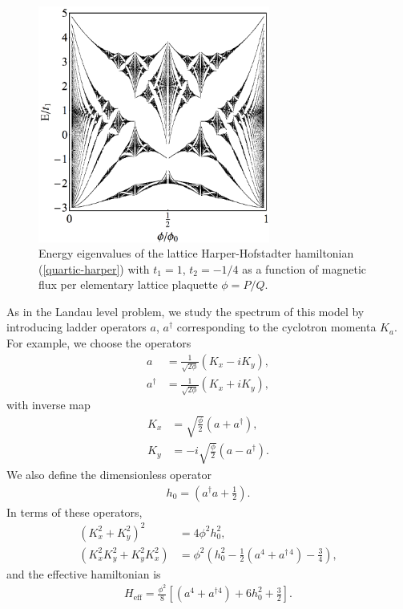 \documentclass[aps,prb,twocolumn,letterpaper,twoside,nobalancelastpage,groupedaddress,amsmath,amssymb,floatfix,citeautoscript]{revtex4-1}
\begin{document}
\begin{figure}[thb]
\centering
\hspace{-0.25in}\includegraphics[width=3.0in]{q-butterfly-raster-1200.pdf}
\caption{\label{butterfly-plot} Energy eigenvalues of the lattice Harper-Hofstadter hamiltonian (\ref{quartic-harper}) with $t_1 = 1$, $t_2 = -1/4$ as a function of magnetic flux per elementary lattice plaquette $\phi = P/Q$.}
\end{figure}

As in the Landau level problem, we study the spectrum of this model by introducing ladder operators $a$, $a^{\dag}$ corresponding to the cyclotron momenta $K_a$. For example, we choose the operators
\begin{align*}
a &= \frac{1}{\sqrt{2\phi}}\left(K_x - iK_y\right),\\
a^{\dag} &= \frac{1}{\sqrt{2\phi}}\left(K_x + iK_y\right),
\end{align*}
with inverse map
\begin{align*}
K_x &= \sqrt{\frac{\phi}{2}}\left(a + a^{\dag}\right),\\
K_y &= -i\sqrt{\frac{\phi}{2}}\left(a - a^{\dag}\right).
\end{align*}
We also define the dimensionless operator
\begin{align*}
h_0 = \left(a^{\dag}a + \frac{1}{2}\right).
\end{align*}
In terms of these operators,
\begin{align*}
\left(K_x^2 + K_y^2\right)^2 &= 4\phi^2 h_0^2, \\
\left(K_x^2K_y^2 + K_y^2K_x^2\right) &= \phi^2\left(h_0^2 -\frac{1}{2}\left(a^4 + a^{\dag\,4}\right) - \frac{3}{4}\right),
\end{align*}
and the effective hamiltonian is
\begin{align}
\label{effective-fock-hamiltonian}
H_{\text{eff}} = \frac{\phi^2}{8}\left[\left(a^4 + a^{\dag 4}\right) + 6h_0^2 + \frac{3}{2}\right].
\end{align}
\end{document}
